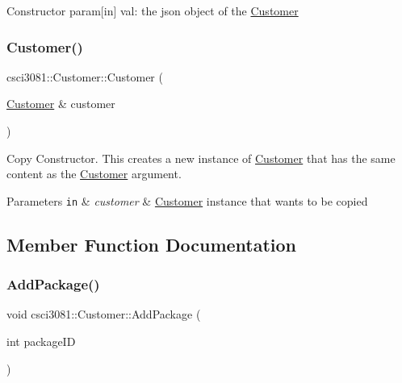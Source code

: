 Constructor param\mbox{[}in\mbox{]} val\+: the json object of the \hyperlink{classcsci3081_1_1Customer}{Customer} \mbox{\label{classcsci3081_1_1Customer_ad4eec3e1ba0f5dbe815e8552eb1715e2}} 
\subsubsection{\texorpdfstring{Customer()}{Customer()}\hspace{0.1cm}{\footnotesize\ttfamily [2/2]}}
{\footnotesize\ttfamily csci3081\+::\+Customer\+::\+Customer (\begin{DoxyParamCaption}\item[{\hyperlink{classcsci3081_1_1Customer}{Customer} \&}]{customer }\end{DoxyParamCaption})}



Copy Constructor. This creates a new instance of \hyperlink{classcsci3081_1_1Customer}{Customer} that has the same content as the \hyperlink{classcsci3081_1_1Customer}{Customer} argument. 


\begin{DoxyParams}[1]{Parameters}
\mbox{\tt in}  & {\em customer} & \hyperlink{classcsci3081_1_1Customer}{Customer} instance that wants to be copied \\
\hline
\end{DoxyParams}


\subsection{Member Function Documentation}
\mbox{\label{classcsci3081_1_1Customer_a7eba42384d9648731c81862c36fed1ec}} 
\subsubsection{\texorpdfstring{Add\+Package()}{AddPackage()}}
{\footnotesize\ttfamily void csci3081\+::\+Customer\+::\+Add\+Package (\begin{DoxyParamCaption}\item[{int}]{package\+ID }\end{DoxyParamCaption})}



